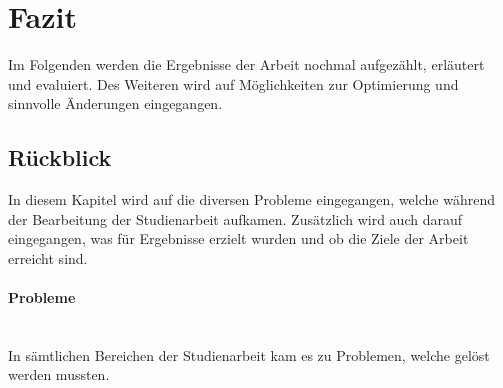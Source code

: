 \section{Fazit}
Im Folgenden werden die Ergebnisse der Arbeit nochmal aufgezählt, erläutert und evaluiert.
Des Weiteren wird auf Möglichkeiten zur Optimierung und sinnvolle Änderungen eingegangen.

\subsection{Rückblick}
In diesem Kapitel wird auf die diversen Probleme eingegangen, welche während der Bearbeitung der Studienarbeit aufkamen.
Zusätzlich wird auch darauf eingegangen, was für Ergebnisse erzielt wurden und ob die Ziele der Arbeit erreicht sind.

\paragraph{Probleme} \mbox{}\\
In sämtlichen Bereichen der Studienarbeit kam es zu Problemen, welche gelöst werden mussten.


